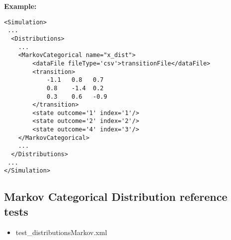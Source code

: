 \textbf{Example:}

\begin{lstlisting}[style=XML]
<Simulation>
 ...
  <Distributions>
    ...
    <MarkovCategorical name="x_dist">
        <dataFile fileType='csv'>transitionFile</dataFile>
        <transition>
            -1.1   0.8   0.7
            0.8    -1.4  0.2
            0.3    0.6   -0.9
        </transition>
        <state outcome='1' index='1'/>
        <state outcome='2' index='2'/>
        <state outcome='4' index='3'/>
    </MarkovCategorical>
    ...
  </Distributions>
 ...
</Simulation>
\end{lstlisting}

\subsection{Markov Categorical Distribution reference tests}
\begin{itemize}
	\item test\_distributionsMarkov.xml
\end{itemize}
